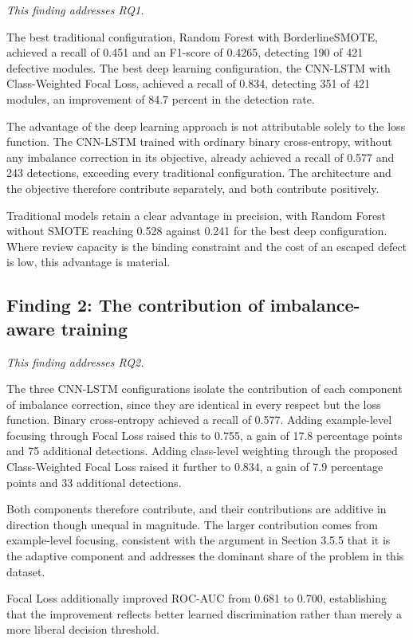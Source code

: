 \documentclass[12pt,a4paper,oneside]{report}
\begin{document}
\textit{This finding addresses RQ1.}

The best traditional configuration, Random Forest with BorderlineSMOTE, achieved a recall of 0.451 and an F1-score of 0.4265, detecting 190 of 421 defective modules. The best deep learning configuration, the CNN-LSTM with Class-Weighted Focal Loss, achieved a recall of 0.834, detecting 351 of 421 modules, an improvement of 84.7 percent in the detection rate.

The advantage of the deep learning approach is not attributable solely to the loss function. The CNN-LSTM trained with ordinary binary cross-entropy, without any imbalance correction in its objective, already achieved a recall of 0.577 and 243 detections, exceeding every traditional configuration. The architecture and the objective therefore contribute separately, and both contribute positively.

Traditional models retain a clear advantage in precision, with Random Forest without SMOTE reaching 0.528 against 0.241 for the best deep configuration. Where review capacity is the binding constraint and the cost of an escaped defect is low, this advantage is material.

\subsection{Finding 2: The contribution of imbalance-aware training}

\textit{This finding addresses RQ2.}

The three CNN-LSTM configurations isolate the contribution of each component of imbalance correction, since they are identical in every respect but the loss function. Binary cross-entropy achieved a recall of 0.577. Adding example-level focusing through Focal Loss raised this to 0.755, a gain of 17.8 percentage points and 75 additional detections. Adding class-level weighting through the proposed Class-Weighted Focal Loss raised it further to 0.834, a gain of 7.9 percentage points and 33 additional detections.

Both components therefore contribute, and their contributions are additive in direction though unequal in magnitude. The larger contribution comes from example-level focusing, consistent with the argument in Section 3.5.5 that it is the adaptive component and addresses the dominant share of the problem in this dataset.

Focal Loss additionally improved ROC-AUC from 0.681 to 0.700, establishing that the improvement reflects better learned discrimination rather than merely a more liberal decision threshold.
\end{document}
